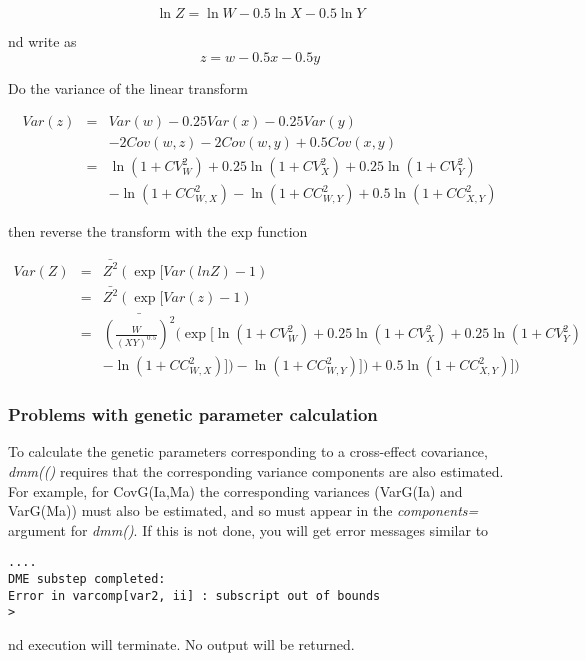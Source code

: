 \documentclass[titlepage]{article}  %
\begin{document}
\begin{displaymath}
\ln Z = \ln W - 0.5 \ln X - 0.5 \ln Y
\end{displaymath}

nd write as
\begin{displaymath}
z = w - 0.5 x - 0.5 y
\end{displaymath}


Do the variance of the linear transform

\begin{eqnarray*}
Var(z) & = & Var(w) - 0.25 Var(x) - 0.25 Var(y) \\
       &   &  - 2 Cov(w,z) - 2 Cov(w,y) + 0.5 Cov(x,y) \\
       & = & \ln(1 + CV^{2}_{W}) + 0.25 \ln(1 + CV^{2}_{X}) + 0.25 \ln(1 + CV^{2}_{Y}) \\
       &   &  - \ln(1 + CC^{2}_{W,X}) - \ln(1 + CC^{2}_{W,Y}) + 0.5 \ln(1 + CC^{2}_{X,Y}) 
\end{eqnarray*}

then reverse the transform with the exp function

\begin{eqnarray*}
Var(Z) & = & \bar{Z^{2}}(\exp[Var(lnZ) - 1) \\
       & = & \bar{Z^{2}}(\exp[Var(z) - 1) \\
       & = & \bar{(\frac{W}{(XY)^{0.5}})^{2}}(\exp[\ln(1+CV^{2}_{W}) + 0.25 \ln(1 + CV^{2}_{X}) + 0.25 \ln(1 + CV^{2}_{Y}) \\
       &   &  - \ln(1 + CC^{2}_{W,X})]) - \ln(1 + CC^{2}_{W,Y})]) + 0.5 \ln(1 + CC^{2}_{X,Y})])
\end{eqnarray*}

\subsubsection{Problems with genetic parameter calculation}
	To calculate the genetic parameters corresponding to a cross-effect covariance, {\em dmm(()} requires that the corresponding variance components are also estimated. For example, for CovG(Ia,Ma) the corresponding variances (VarG(Ia) and VarG(Ma)) must also be estimated, and so must appear in the {\em components=} argument for {\em dmm()}.
	If this is not done, you  will get error messages similar to
\begin{verbatim}
....
DME substep completed:
Error in varcomp[var2, ii] : subscript out of bounds
>
\end{verbatim}
nd execution will terminate. No output will be returned.
\end{document}
